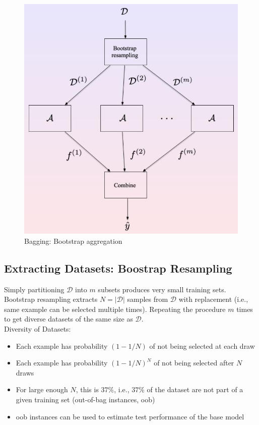 \begin{figure}[H]
	\centering
	\includegraphics[scale=0.4]{
        images/17_EnsembleMethods_bagging.jpg
    }
	\caption{Bagging: Bootstrap aggregation}
\end{figure}

\subsection{Extracting Datasets: Boostrap Resampling}
Simply partitioning $\mathcal{D}$ into $m$ subsets produces very small training
sets. Bootstrap resampling extracts $N=|\mathcal{D}|$ samples from $\mathcal{D}$
with replacement (i.e., same example can be selected multiple times). Repeating
the procedure $m$ times to get diverse datasets of the same size as
$\mathcal{D}$.\\

\noindent
Diversity of Datasets:
\begin{itemize}
	\item Each example has probability $(1-1 / N)$ of not being selected at each draw

	\item Each example has probability $(1-1 / N)^{N}$ of not being selected after
		$N$ draws

	\item For large enough $N$, this is $37 \%$, i.e., $37 \%$ of the dataset are not
		part of a given training set (out-of-bag instances, oob)

	\item oob instances can be used to estimate test performance of the base model
\end{itemize}

